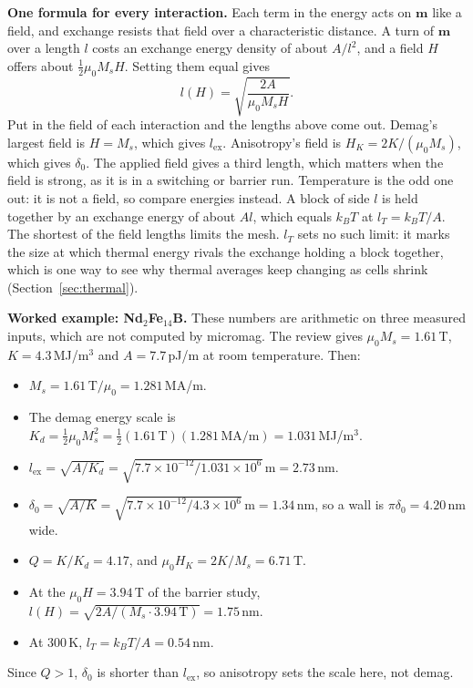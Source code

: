 \documentclass[10pt,a4paper]{article}
\newcommand{\mo}{\mu_0}
\newcommand{\vm}{\mathbf{m}}
\begin{document}
\textbf{One formula for every interaction.} Each term in the energy acts on $\vm$ like a field, and exchange resists that
field over a characteristic distance. A turn of $\vm$ over a length $l$ costs an exchange energy density of about $A/l^2$,
and a field $H$ offers about $\frac12\mo M_s H$. Setting them equal gives
\[
  l(H) = \sqrt{\frac{2A}{\mo M_s H}}.
\]
Put in the field of each interaction and the lengths above come out. Demag's largest field is $H = M_s$, which gives
$l_\mathrm{ex}$. Anisotropy's field is $H_K = 2K/(\mo M_s)$, which gives $\delta_0$. The applied field gives a third
length, which matters when the field is strong, as it is in a switching or barrier run. Temperature is the odd one out:
it is not a field, so compare energies instead. A block of side $l$ is held together by an exchange energy of about $Al$, which
equals $k_BT$ at $l_T = k_BT/A$. The shortest of the field lengths limits the mesh. $l_T$ sets no such limit: it marks the size at
which thermal energy rivals the exchange holding a block together, which is one way to see why thermal averages keep changing as
cells shrink (Section~\ref{sec:thermal}).

\textbf{Worked example: Nd$_2$Fe$_{14}$B.} These numbers are arithmetic on three measured inputs, which are not computed by
micromag. The review \cite{fischbacher2018} gives $\mo M_s = 1.61$\,T, $K = 4.3$\,MJ/m$^3$ and $A = 7.7$\,pJ/m at room
temperature. Then:
\begin{itemize}[nosep]
  \item $M_s = 1.61\,\mathrm{T}/\mo = 1.281$\,MA/m.
  \item The demag energy scale is $K_d = \frac12\mo M_s^2 = \frac12(1.61\,\mathrm{T})(1.281\,\mathrm{MA/m}) = 1.031$\,MJ/m$^3$.
  \item $l_\mathrm{ex} = \sqrt{A/K_d} = \sqrt{7.7\times10^{-12}/1.031\times10^{6}}\,\mathrm{m} = 2.73$\,nm.
  \item $\delta_0 = \sqrt{A/K} = \sqrt{7.7\times10^{-12}/4.3\times10^{6}}\,\mathrm{m} = 1.34$\,nm, so a wall is $\pi\delta_0 = 4.20$\,nm wide.
  \item $Q = K/K_d = 4.17$, and $\mo H_K = 2K/M_s = 6.71$\,T.
  \item At the $\mo H = 3.94$\,T of the barrier study, $l(H) = \sqrt{2A/(M_s\cdot 3.94\,\mathrm{T})} = 1.75$\,nm.
  \item At 300\,K, $l_T = k_BT/A = 0.54$\,nm.
\end{itemize}
Since $Q > 1$, $\delta_0$ is shorter than $l_\mathrm{ex}$, so anisotropy sets the scale here, not demag.
\end{document}
